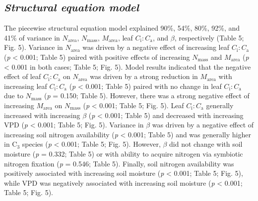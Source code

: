 \subsection{\textit{Structural equation model}}
\noindent The piecewise structural equation model explained 90\%, 54\%, 80\%, 92\%, and 41\% of variance in $N_\mathrm{area}$, $N_\mathrm{mass}$, $M_\mathrm{area}$, leaf $C_\mathrm{i}\mathrm{:}C_\mathrm{a}$, and $\beta$, respectively (Table 5; Fig. 5). Variance in $N_\mathrm{area}$ was driven by a negative effect of increasing leaf $C_\mathrm{i}\mathrm{:}C_\mathrm{a}$ (\textit{p} < 0.001; Table 5) paired with positive effects of increasing $N_\mathrm{mass}$ and $M_\mathrm{area}$ (\textit{p} < 0.001 in both cases; Table 5; Fig. 5). Model results indicated that the negative effect of leaf $C_\mathrm{i}\mathrm{:}C_\mathrm{a}$ on $N_\mathrm{area}$ was driven by a strong reduction in $M_\mathrm{area}$ with increasing leaf $C_\mathrm{i}\mathrm{:}C_\mathrm{a}$ (\textit{p} < 0.001; Table 5) paired with no change in leaf $C_\mathrm{i}\mathrm{:}C_\mathrm{a}$ due to $N_\mathrm{mass}$ (\textit{p} = 0.150; Table 5). However, there was a strong negative effect of increasing $M_\mathrm{area}$ on $N_\mathrm{mass}$ (\textit{p} < 0.001; Table 5; Fig. 5). Leaf $C_\mathrm{i}\mathrm{:}C_\mathrm{a}$ generally increased with increasing $\beta$  (\textit{p} < 0.001; Table 5) and decreased with increasing VPD (\textit{p} < 0.001; Table 5; Fig. 5). Variance in $\beta$  was driven by a negative effect of increasing soil nitrogen availability (\textit{p} < 0.001; Table 5) and was generally higher in C$_3$ species (\textit{p} < 0.001; Table 5; Fig. 5). However, $\beta$ did not change with soil moisture (\textit{p} = 0.332; Table 5) or with ability to acquire nitrogen via symbiotic nitrogen fixation (\textit{p} = 0.546; Table 5). Finally, soil nitrogen availability was positively associated with increasing soil moisture (\textit{p} < 0.001; Table 5; Fig. 5), while VPD was negatively associated with increasing soil moisture (\textit{p} < 0.001; Table 5; Fig. 5).

